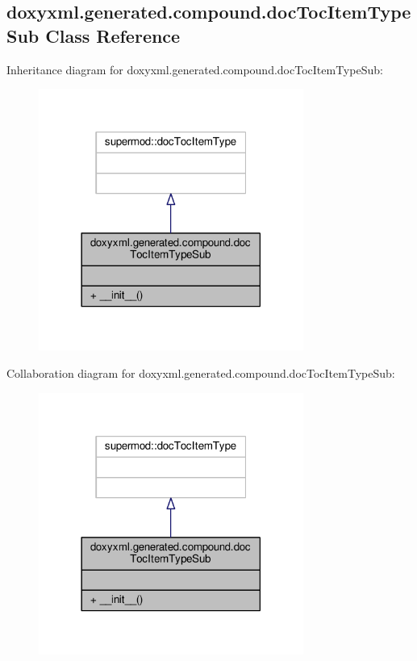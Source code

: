 \subsection{doxyxml.\+generated.\+compound.\+doc\+Toc\+Item\+Type\+Sub Class Reference}
\label{classdoxyxml_1_1generated_1_1compound_1_1docTocItemTypeSub}


Inheritance diagram for doxyxml.\+generated.\+compound.\+doc\+Toc\+Item\+Type\+Sub\+:
\nopagebreak
\begin{figure}[H]
\begin{center}
\leavevmode
\includegraphics[width=246pt]{d2/d6e/classdoxyxml_1_1generated_1_1compound_1_1docTocItemTypeSub__inherit__graph}
\end{center}
\end{figure}


Collaboration diagram for doxyxml.\+generated.\+compound.\+doc\+Toc\+Item\+Type\+Sub\+:
\nopagebreak
\begin{figure}[H]
\begin{center}
\leavevmode
\includegraphics[width=246pt]{dc/dff/classdoxyxml_1_1generated_1_1compound_1_1docTocItemTypeSub__coll__graph}
\end{center}
\end{figure}
